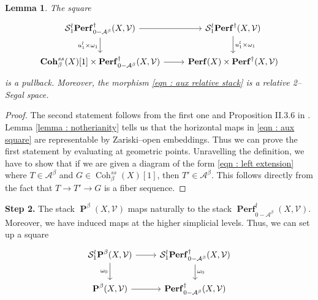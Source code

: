 \documentclass[11pt]{article}
\newtheorem{lemma}[theorem]{Lemma}
\newcommand{\segal}{\mathcal{S}}
\newcommand{\abeta}{\mathcal{A}^{\beta}}
\newcommand{\cohbetass}{\operatorname{Coh}^{ss}_{\beta}(X)}
\newcommand{\perfstack}{\boldsymbol{\operatorname{Perf}}(X)}
\newcommand{\cohbetassstack}{\boldsymbol{\operatorname{Coh}}^{ss}_{\beta}(X)}
\newcommand{\framing}{\mathcal{V}}
\newcommand{\pairs}{\boldsymbol{\operatorname{P}}^{\beta}(X,\mathcal{V})}
\newcommand{\flags}{\boldsymbol{\operatorname{Perf}}^{\dagger}(X,\mathcal{V})}
\begin{document}
\begin{lemma}\label{lemma : step 1}
The square
\begin{equation}\label{eqn : aux square}
\begin{tikzcd}
{\segal_1^l\boldsymbol{\operatorname{Perf}}^{\dagger}_{0-\abeta}(X,\framing)} & {\segal^l_1\flags} \\
	{\cohbetassstack[1] \times \boldsymbol{\operatorname{Perf}}^{\dagger}_{0-\abeta}(X,\framing)} & {\perfstack \times \flags}
	\arrow[from=1-1, to=1-2]
	\arrow["{u_1^l \times \omega_1}"', from=1-1, to=2-1]
	\arrow["{u_1^l \times \omega_1}", from=1-2, to=2-2]
	\arrow[from=2-1, to=2-2]
\end{tikzcd}
\end{equation}
is a pullback. Moreover, the morphism \eqref{eqn : aux relative stack} is a relative 2--Segal space.
\end{lemma}
\begin{proof}
    The second statement follows from the first one and Proposition II.3.6 in \cite{dps}. Lemma \ref{lemma : notherianity} tells us that the horizontal maps in \eqref{eqn : aux square} are representable by Zariski--open embeddings. Thus we can prove the first statement by evaluating at geometric points. Unravelling the definition, we have to show that if we are given a diagram of the form \eqref{eqn : left extension} where $T \in \abeta$ and $G \in \cohbetass[1]$, then $T' \in \abeta$. This follows directly from the fact that $T \rightarrow T'\rightarrow G$ is a fiber sequence.
\end{proof}

\noindent\textbf{Step 2. }The stack $\pairs$ maps naturally to the stack $\boldsymbol{\operatorname{Perf}}^{\dagger}_{0-\abeta}(X,\framing)$. Moreover, we have induced maps at the higher simplicial levels. Thus, we can set up a square
\begin{equation}\label{eqn : non aux square}
\begin{tikzcd}
{\segal_1^l\pairs} & {\segal_1^l\boldsymbol{\operatorname{Perf}}^{\dagger}_{0-\abeta}(X,\framing)} \\
	{\pairs} & {\boldsymbol{\operatorname{Perf}}^{\dagger}_{0-\abeta}(X,\framing)}
	\arrow[from=1-1, to=1-2]
	\arrow["{\omega_0}"', from=1-1, to=2-1]
	\arrow["{\omega_0}", from=1-2, to=2-2]
	\arrow[from=2-1, to=2-2]
\end{tikzcd}
\end{equation}
\end{document}

